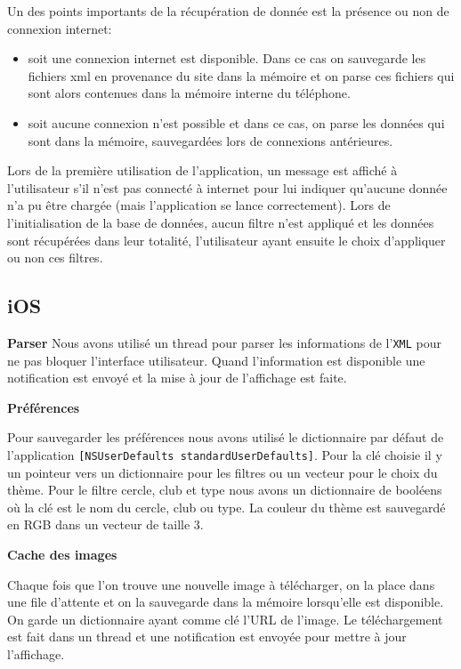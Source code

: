 \documentclass[a4paper, 11pt]{article}
\begin{document}
\vspace{0.5cm}
\noindent Un des points importants de la récupération de donnée est la présence ou non de connexion internet: 
\begin{itemize}
\item soit une connexion internet est disponible. Dans ce cas on sauvegarde les fichiers xml en provenance du site dans la mémoire et on parse ces fichiers qui sont alors contenues dans la mémoire interne du téléphone.
\item soit aucune connexion n'est possible et dans ce cas, on parse les données qui sont dans la mémoire, sauvegardées lors de connexions antérieures.\\
\end{itemize}

\noindent Lors de la première utilisation de l'application, un message est affiché à l'utilisateur s'il n'est pas connecté à internet pour lui indiquer qu'aucune donnée n'a pu être chargée (mais l'application se lance correctement).
 Lors de l'initialisation de la base de données, aucun filtre n'est appliqué et les données sont récupérées dans leur totalité, l'utilisateur ayant ensuite le choix d'appliquer ou non ces filtres.

\subsection{iOS}
{\bf Parser}
Nous avons utilisé un thread pour parser les informations de l'\texttt{XML} pour ne pas bloquer l'interface utilisateur. Quand l'information est disponible une notification est envoyé et la mise à jour de l'affichage est faite.


{\bf Préférences}

Pour sauvegarder les préférences nous avons utilisé le dictionnaire par défaut de l'application 
\texttt{[NSUserDefaults standardUserDefaults]}. Pour la clé choisie il y un pointeur vers un dictionnaire pour les filtres ou un vecteur pour le choix du thème. Pour le filtre cercle, club et type nous avons un dictionnaire de booléens où la clé est le nom du cercle, club ou type. La couleur du thème est sauvegardé en RGB dans un vecteur de taille 3. 
 
{\bf Cache des images}

Chaque fois que l'on trouve une nouvelle image à télécharger, on la place dans une file d'attente et on la sauvegarde dans la mémoire lorsqu'elle est disponible. On garde un dictionnaire ayant comme clé l'URL de l'image. Le téléchargement est fait dans un thread et une notification est envoyée pour mettre à jour l'affichage.
\end{document}
